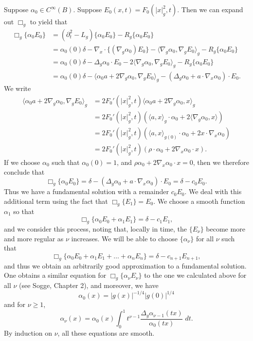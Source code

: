Suppose $\alpha_0 \in C^\infty(B)$. Suppose $E_0(x,t) = F_0(|x|_g^2,t)$. Then we can expand out $\Box_g$ to yield that
%
\begin{align*}
    \Box_g \{ \alpha_0 E_0 \} &= (\partial_t^2 - L_g) \{ \alpha_0 E_0 \} - R_g \{ \alpha_0 E_0 \}\\
    &= \alpha_0(0) \delta - \nabla_x \cdot \{ (\nabla_g \alpha_0) E_0 \} - \langle \nabla_g \alpha_0, \nabla_g E_0 \rangle_g - R_g \{ \alpha_0 E_0 \}\\
    &= \alpha_0(0) \delta - \Delta_g \alpha_0 \cdot E_0 - 2 \langle \nabla_g \alpha_0, \nabla_g E_0 \rangle_g - R_g \{ \alpha_0 E_0 \}\\
    &= \alpha_0(0) \delta - \langle \alpha_0 a + 2 \nabla_g \alpha_0, \nabla_g E_0 \rangle_g - (\Delta_g \alpha_0 + a \cdot \nabla_x \alpha_0) \cdot E_0.
\end{align*}
%
We write
%
\begin{align*}
    \langle \alpha_0 a + 2 \nabla_g \alpha_0, \nabla_g E_0 \rangle_g &= 2 F_0'(|x|_g^2,t) \langle \alpha_0 a + 2 \nabla_g \alpha_0, x \rangle_g\\
    &= 2 F_0'(|x|_g^2,t) \left( \langle a, x \rangle_g \cdot \alpha_0 + 2 \langle \nabla_g \alpha_0, x \rangle \right)\\
    &= 2 F_0'(|x|_g^2,t) \left( \langle a, x \rangle_{g(0)} \cdot \alpha_0 + 2 x \cdot \nabla_x \alpha_0 \right)\\
    &= 2 F_0'(|x|_g^2,t) \left( \rho \cdot \alpha_0 + 2 \nabla_x \alpha_0 \cdot x \right).
\end{align*}
%
If we choose $\alpha_0$ such that $\alpha_0(0) = 1$, and $\rho \alpha_0 + 2 \nabla_x \alpha_0 \cdot x = 0$, then we therefore conclude that
%
\[ \Box_g \{ \alpha_0 E_0 \} = \delta - (\Delta_g \alpha_0 + a \cdot \nabla_x \alpha_0) \cdot E_0 = \delta - c_0 E_0. \] 
%
Thus we have a fundamental solution with a remainder $c_0 E_0$. We deal with this additional term using the fact that $\Box_g \{ E_1 \} = E_0$. We choose a smooth function $\alpha_1$ so that
%
\[ \Box_g \{ \alpha_0 E_0 + \alpha_1 E_1 \} = \delta - c_1 E_1, \]
%
and we consider this process, noting that, locally in time, the $\{ E_\nu \}$ become more and more regular as $\nu$ increases. We will be able to choose $\{ \alpha_\nu \}$ for all $\nu$ such that
%
\[ \Box_g \{ \alpha_0 E_0 + \alpha_1 E_1 + \dots + \alpha_n E_n \} = \delta - c_{n+1} E_{n+1}, \]
%
and thus we obtain an arbitrarily good approximation to a fundamental solution. One obtains a similar equation for $\Box_g \{ \alpha_\nu E_\nu \}$ to the one we calculated above for all $\nu$ (see Sogge, Chapter 2), and moreover, we have
%
\[ \alpha_0(x) = |g(x)|^{-1/4} |g(0)|^{1/4} \]
%
and for $\nu \geq 1$,
%
\[ \alpha_\nu(x) = \alpha_0(x) \int_0^1 t^{\nu-1} \frac{\Delta_g \alpha_{\nu-1}(tx)}{\alpha_0(tx)}\; dt. \]
%
By induction on $\nu$, all these equations are smooth.

